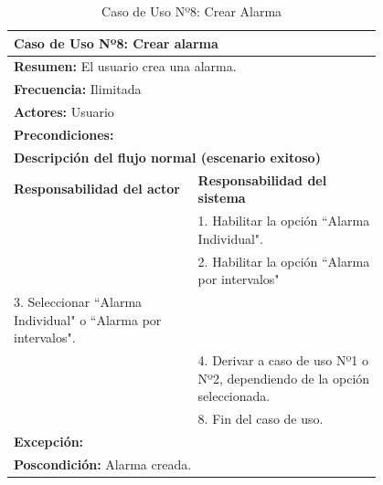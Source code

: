 \begin{table}[H]
    \centering
    \caption{Caso de Uso Nº8: Crear Alarma}
    
    \begin{tabular}{| p{0.4\linewidth} | p{0.4\linewidth} |}
        \hline
        \multicolumn{2}{|l|}{\textbf{Caso de Uso Nº8:} Crear alarma} \\
        \hline
        \multicolumn{2}{|l|}{\textbf{Resumen:} El usuario crea una alarma.} \\
        \hline
        \multicolumn{2}{|l|}{\textbf{Frecuencia:} Ilimitada} \\
        \hline
        \multicolumn{2}{|l|}{\textbf{Actores:} Usuario} \\
        \hline
        \multicolumn{2}{|p{0.8\linewidth}|}{\textbf{Precondiciones:} } \\
        \hline
        \multicolumn{2}{|l|}{\textbf{Descripción del flujo normal (escenario exitoso)} } \\
        \hline
        \textbf{Responsabilidad del actor} & \textbf{Responsabilidad del sistema} \\
        & 1. Habilitar la opción ``Alarma Individual".\\
        & 2. Habilitar la opción ``Alarma por intervalos"\\
        3. Seleccionar ``Alarma Individual" o ``Alarma por intervalos". &\\
        & 4. Derivar a caso de uso Nº1 o Nº2, dependiendo de la opción seleccionada.\\
        & 8. Fin del caso de uso. \\
        \hline
        \multicolumn{2}{|p{0.8\linewidth}|}{\textbf{Excepción:}}\\
        \hline
        \multicolumn{2}{|l|}{\textbf{Poscondición:} Alarma creada.} \\
        \hline
    \end{tabular}

    \label{table:8}
\end{table}

